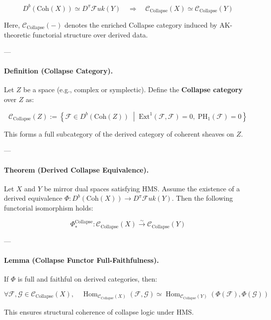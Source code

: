 \documentclass[11pt]{article}
\begin{document}
\begin{axiom}
\begin{axiom}
{{\[
D^b(\mathrm{Coh}(X)) \simeq D^\pi \mathcal{F}uk(Y)
\quad \Longrightarrow \quad
\mathcal{C}_{\text{Collapse}}(X) \simeq \mathcal{C}_{\text{Collapse}}(Y)
\]

Here, \( \mathcal{C}_{\text{Collapse}}(-) \) denotes the enriched Collapse category induced by AK-theoretic functorial structure over derived data.

---

\paragraph{Definition (Collapse Category).}
Let \( Z \) be a space (e.g., complex or symplectic).  
Define the \textbf{Collapse category} over \( Z \) as:

\[
\mathcal{C}_{\text{Collapse}}(Z) := \left\{
  \mathcal{F} \in D^b(\mathrm{Coh}(Z)) \;\middle|\;
  \mathrm{Ext}^1(\mathcal{F}, \mathcal{F}) = 0,\; \mathrm{PH}_1(\mathcal{F}) = 0
\right\}
\]

This forms a full subcategory of the derived category of coherent sheaves on \( Z \).

---

\paragraph{Theorem (Derived Collapse Equivalence).}

Let \( X \) and \( Y \) be mirror dual spaces satisfying HMS.  
Assume the existence of a derived equivalence \( \Phi: D^b(\mathrm{Coh}(X)) \to D^\pi \mathcal{F}uk(Y) \).  
Then the following functorial isomorphism holds:

\[
\Phi_*^{\mathrm{Collapse}} : \mathcal{C}_{\text{Collapse}}(X) \xrightarrow{\sim} \mathcal{C}_{\text{Collapse}}(Y)
\]

---

\paragraph{Lemma (Collapse Functor Full-Faithfulness).}

If \( \Phi \) is full and faithful on derived categories, then:

\[
\forall \mathcal{F}, \mathcal{G} \in \mathcal{C}_{\text{Collapse}}(X), \quad
\operatorname{Hom}_{\mathcal{C}_{\text{Collapse}}(X)}(\mathcal{F}, \mathcal{G})
\simeq
\operatorname{Hom}_{\mathcal{C}_{\text{Collapse}}(Y)}(\Phi(\mathcal{F}), \Phi(\mathcal{G}))
\]

This ensures structural coherence of collapse logic under HMS.

}}
\end{axiom}
\end{axiom}
\end{document}
